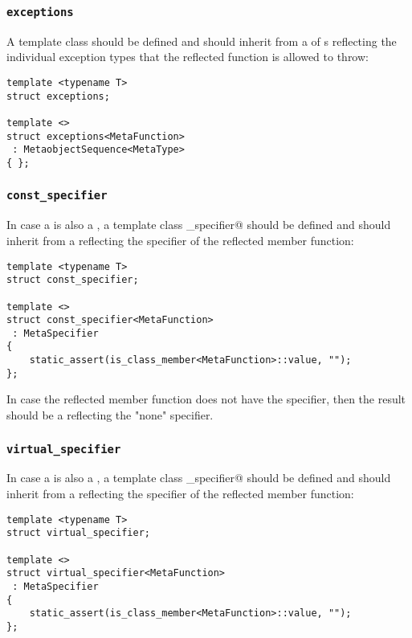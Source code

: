 \subsubsection{\texttt{exceptions}}

A template class \verb@exceptions@ should be defined and should inherit from
a  of s reflecting the individual exception types
that the reflected function is allowed to throw:

\begin{verbatim}
template <typename T>
struct exceptions;

template <>
struct exceptions<MetaFunction>
 : MetaobjectSequence<MetaType>
{ };
\end{verbatim}

\subsubsection{\texttt{const\_specifier}}

In case a  is also a ,
a template class \verb@const_specifier@ should be defined and should inherit from
a  reflecting the \verb@const@ specifier of the reflected member function:

\begin{verbatim}
template <typename T>
struct const_specifier;

template <>
struct const_specifier<MetaFunction>
 : MetaSpecifier
{
	static_assert(is_class_member<MetaFunction>::value, "");
};
\end{verbatim}

In case the reflected member function does not have the \verb@const@ specifier,
then the result should be a  reflecting the "none" specifier.

\subsubsection{\texttt{virtual\_specifier}}

In case a  is also a ,
a template class \verb@virtual_specifier@ should be defined and should inherit from
a  reflecting the \verb@virtual@ specifier of the reflected member function:

\begin{verbatim}
template <typename T>
struct virtual_specifier;

template <>
struct virtual_specifier<MetaFunction>
 : MetaSpecifier
{
	static_assert(is_class_member<MetaFunction>::value, "");
};
\end{verbatim}

